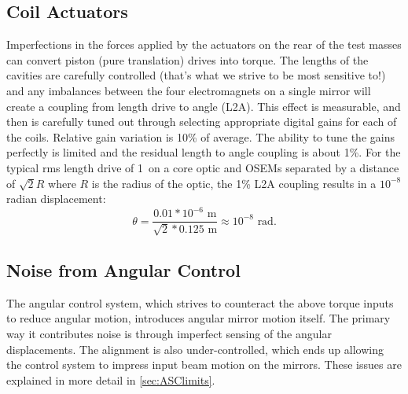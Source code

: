 



\subsection{Coil Actuators} 
\label{sec:L2A}
Imperfections in the forces applied by the actuators on the rear of the test masses can convert piston (pure translation) drives into torque. The lengths of the cavities are carefully controlled (that's what we strive to be most sensitive to!) and any imbalances between the four electromagnets on a single mirror will create a coupling from length drive to angle (L2A). This effect is measurable, and then is carefully tuned out through selecting appropriate digital gains for each of the coils. Relative gain variation is 10\% of average. The ability to tune the gains perfectly is limited and the residual length to angle coupling is about 1\%. For the typical rms length drive of 1~\micronspace on a core optic and OSEMs separated by a distance of $\sqrt{2} R$ where $R$ is the radius of the optic, the 1\% L2A coupling results in a $10^{-8}$ radian displacement: 
\begin{equation} 
\theta = \frac{0.01 * 10^{-6} \mbox{ m}}{\sqrt{2} * 0.125 \mbox{ m}} \approx 10^{-8} \mbox{ rad}.  
\end{equation}



\subsection{Noise from Angular Control}
The angular control system, which strives to counteract the above torque inputs to reduce angular motion, introduces angular mirror motion itself. The primary way it contributes noise is through imperfect sensing of the angular displacements. The alignment is also under-controlled, which ends up allowing the control system to impress input beam motion on the mirrors. These issues are explained in more detail in \ref{sec:ASClimits}.


